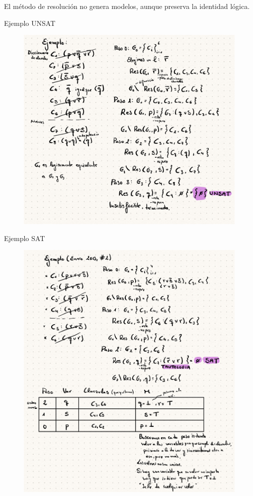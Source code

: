 \documentclass[12pt, twoside, openright]{report} %
\begin{document}
	
  El método de resolución no genera modelos, aunque preserva la
  identidad lógica.


  
    Ejemplo UNSAT
	\begin{figure}[H]
		{\includegraphics[scale=.25]{Untitled 31.png}}
	\end{figure}
	\pagebreak
	Ejemplo SAT
	\begin{figure}[H]
		{\includegraphics[scale=.28]{Untitled 32.png}}
	\end{figure}
	\pagebreak
\end{document}
